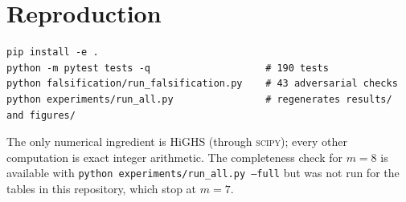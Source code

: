 \documentclass[11pt,a4paper]{article}
\theoremstyle{definition}
\theoremstyle{remark}
\begin{document}
\section{Reproduction}

\begin{verbatim}
pip install -e .
python -m pytest tests -q                    # 190 tests
python falsification/run_falsification.py    # 43 adversarial checks
python experiments/run_all.py                # regenerates results/ and figures/
\end{verbatim}
The only numerical ingredient is HiGHS (through \textsc{scipy}); every other computation is
exact integer arithmetic.  The completeness check for $m=8$ is available with
\texttt{python experiments/run\_all.py --full} but was not run for the tables in this
repository, which stop at $m=7$.
\end{document}
